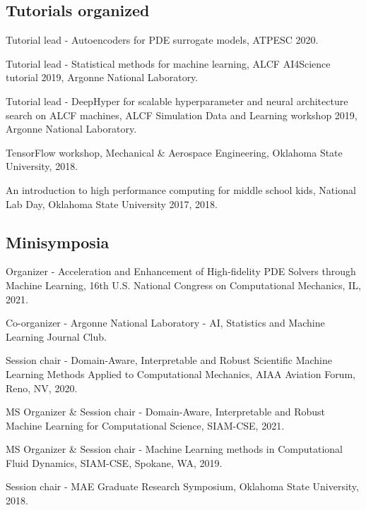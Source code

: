 \documentclass[letterpaper]{article}
\renewenvironment{itemize}{
  \begin{list}{}{
    \setlength{\leftmargin}{1.5em}
  }
}{
  \end{list}
}
\begin{document}
\subsection*{Tutorials organized}

\begin{itemize}
  \item Tutorial lead - Autoencoders for PDE surrogate models, ATPESC 2020.
  \item Tutorial lead - Statistical methods for machine learning, ALCF AI4Science tutorial 2019, Argonne National Laboratory.
  \item Tutorial lead - DeepHyper for scalable hyperparameter and neural architecture search on ALCF machines, ALCF Simulation Data and Learning workshop 2019, Argonne National Laboratory.
  \item TensorFlow workshop, Mechanical \& Aerospace Engineering, Oklahoma State University, 2018.
  \item An introduction to high performance computing for middle school kids, National Lab Day, Oklahoma State University 2017, 2018.
\end{itemize}

\subsection*{Minisymposia}

\begin{itemize}
  \item Organizer - Acceleration and Enhancement of High-fidelity PDE Solvers through Machine Learning, 16th U.S. National Congress on Computational Mechanics, IL, 2021.
  \item Co-organizer - Argonne National Laboratory - AI, Statistics and Machine Learning Journal Club.
  \item Session chair - Domain-Aware, Interpretable and Robust Scientific Machine Learning Methods Applied to Computational Mechanics, AIAA Aviation Forum, Reno, NV, 2020.
  \item MS Organizer \& Session chair - Domain-Aware, Interpretable and Robust Machine Learning for Computational Science, SIAM-CSE, 2021.
  \item MS Organizer \& Session chair - Machine Learning methods in Computational Fluid Dynamics, SIAM-CSE, Spokane, WA, 2019.
  \item Session chair - MAE Graduate Research Symposium, Oklahoma State University, 2018.
\end{itemize}
\end{document}
